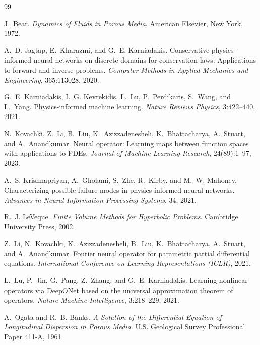 \documentclass[11pt]{article}
\begin{document}

\begin{thebibliography}{99}

J.~Bear.
\textit{Dynamics of Fluids in Porous Media}.
American Elsevier, New York, 1972.

A.~D. Jagtap, E.~Kharazmi, and G.~E. Karniadakis.
Conservative physics-informed neural networks on discrete domains for
conservation laws: Applications to forward and inverse problems.
\textit{Computer Methods in Applied Mechanics and Engineering},
365:113028, 2020.

G.~E. Karniadakis, I.~G. Kevrekidis, L.~Lu, P.~Perdikaris, S.~Wang, and L.~Yang.
Physics-informed machine learning.
\textit{Nature Reviews Physics}, 3:422--440, 2021.

N.~Kovachki, Z.~Li, B.~Liu, K.~Azizzadenesheli, K.~Bhattacharya, A.~Stuart,
and A.~Anandkumar.
Neural operator: Learning maps between function spaces with applications to
PDEs.
\textit{Journal of Machine Learning Research}, 24(89):1--97, 2023.

A.~S. Krishnapriyan, A.~Gholami, S.~Zhe, R.~Kirby, and M.~W. Mahoney.
Characterizing possible failure modes in physics-informed neural networks.
\textit{Advances in Neural Information Processing Systems}, 34, 2021.

R.~J. LeVeque.
\textit{Finite Volume Methods for Hyperbolic Problems}.
Cambridge University Press, 2002.

Z.~Li, N.~Kovachki, K.~Azizzadenesheli, B.~Liu, K.~Bhattacharya, A.~Stuart,
and A.~Anandkumar.
Fourier neural operator for parametric partial differential equations.
\textit{International Conference on Learning Representations (ICLR)}, 2021.

L.~Lu, P.~Jin, G.~Pang, Z.~Zhang, and G.~E. Karniadakis.
Learning nonlinear operators via DeepONet based on the universal approximation
theorem of operators.
\textit{Nature Machine Intelligence}, 3:218--229, 2021.

A.~Ogata and R.~B. Banks.
\textit{A Solution of the Differential Equation of Longitudinal Dispersion in
Porous Media}.
U.S. Geological Survey Professional Paper 411-A, 1961.


\end{thebibliography}
\end{document}
